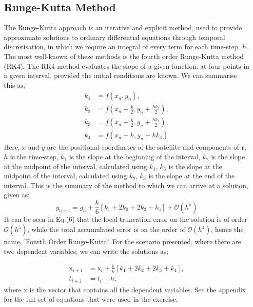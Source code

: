 \documentclass{revtex4-2}
\begin{document}
\subsection{Runge-Kutta Method}
The Runge-Kutta approach is an iterative and explicit method, used to provide approximate solutions to ordinary differential equations through temporal discretisation, in which
we require an integral of every term for each time-step, $h$. The most well-known of these methods is the fourth order Runge-Kutta method (RK4). The RK4 method evaluates the slope
of a given function, at four points in a given interval, provided the initial conditions are known. We can summarise this as;
\begin{align}
    k_1 & = f(x_n, y_n),                                \\
    k_2 & = f(x_n + \frac{h}{2}, y_n + \frac{hk_1}{2}), \\
    k_3 & = f(x_n + \frac{h}{2}, y_n + \frac{hk_1}{2}), \\
    k_4 & = f(x_n + h, y_n + hk_3)
\end{align}
Here, $x$ and $y$ are the positional coordinates of the satellite and components of $\bm{r}$, $h$ is the time-step, $k_1$ is the slope at the beginning of the interval, $k_2$
is the slope at the midpoint of the interval, calculated using $k_1$, $k_3$ is the slope at the midpoint of the interval, calculated using $k_2$, $k_3$ is the slope at the end of the
interval. This is the summary of the method to which we can arrive at a solution, given as;
\begin{equation}
    y_{n+1} = y_n + \frac{h}{6}\left[k_1 + 2k_2 + 2k_3 + k_4\right] +\mathcal{O}(h^5)
\end{equation}
It can be seen in Eq.(6) that the local truncation error on the solution is of order $\mathcal{O}(h^5)$, while the total accumulated error is on the order of $\mathcal{O}(h^4)$,
hence the name, 'Fourth Order Runge-Kutta'. For the scenario presented, where there are two dependent variables, we can write the solutions as;

\begin{align}
    \bm{\mathrm{x}}_{i+1} & = \bm{\mathrm{x}}_i + \frac{h}{6}\left[k_1 + 2k_2 + 2k_3 + k_4\right], \\
    t_{i+1}               & = t_i + h,
\end{align}
where $\bm{\mathrm{x}}$ is the vector that contains all the dependent variables. See the appendix for the full set of equations that were used in the exercise.
\end{document}
